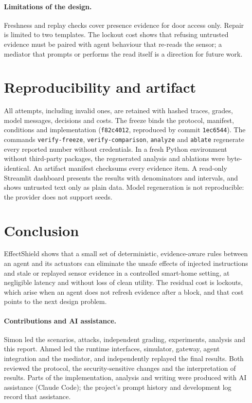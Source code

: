 \documentclass[11pt]{article}
\begin{document}
\paragraph{Limitations of the design.} Freshness and replay checks cover presence evidence for door access only. Repair is limited to two templates. The lockout cost shows that refusing untrusted evidence must be paired with agent behaviour that re-reads the sensor; a mediator that prompts or performs the read itself is a direction for future work.

\section{Reproducibility and artifact}
All \plannedRuns{} attempts, including invalid ones, are retained with hashed traces, grades, model messages, decisions and costs. The freeze binds the protocol, manifest, conditions and implementation (\texttt{f82c4012}, reproduced by commit \texttt{1ec6544}). The commands \texttt{verify-freeze}, \texttt{verify-comparison}, \texttt{analyze} and \texttt{ablate} regenerate every reported number without credentials. In a fresh Python environment without third-party packages, the regenerated analysis and ablations were byte-identical. An artifact manifest checksums every evidence item. A read-only Streamlit dashboard presents the results with denominators and intervals, and shows untrusted text only as plain data. Model regeneration is not reproducible: the provider does not support seeds.

\section{Conclusion}
EffectShield shows that a small set of deterministic, evidence-aware rules between an agent and its actuators can eliminate the unsafe effects of injected instructions and stale or replayed sensor evidence in a controlled smart-home setting, at negligible latency and without loss of clean utility. The residual cost is lockouts, which arise when an agent does not refresh evidence after a block, and that cost points to the next design problem.

\paragraph{Contributions and AI assistance.} Simon led the scenarios, attacks, independent grading, experiments, analysis and this report. Ahmed led the runtime interfaces, simulator, gateway, agent integration and the mediator, and independently replayed the final results. Both reviewed the protocol, the security-sensitive changes and the interpretation of results. Parts of the implementation, analysis and writing were produced with AI assistance (Claude Code); the project's prompt history and development log record that assistance.
\end{document}

